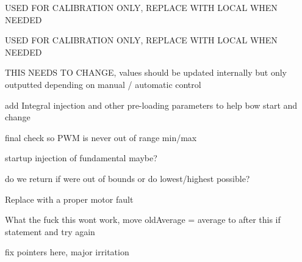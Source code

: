 
\begin{DoxyRefList}
\item[Member \mbox{\hyperlink{struct__calibrationData_a7359cc201af09ef84f616f19bf21a82b}{\+\_\+calibration\+Data\+::max\+Speed\+PWM}} ]\label{todo__todo000007}%
%
USED FOR CALIBRATION ONLY, REPLACE WITH LOCAL WHEN NEEDED  
\item[Member \mbox{\hyperlink{struct__calibrationData_a703fec13dcf0d8cf024236c6c97ca84f}{\+\_\+calibration\+Data\+::min\+Speed\+PWM}} ]\label{todo__todo000006}%
%
USED FOR CALIBRATION ONLY, REPLACE WITH LOCAL WHEN NEEDED  
\item[File \mbox{\hyperlink{bowcontrol_8cpp}{bowcontrol.cpp}} ]\label{todo__todo000001}%
%
THIS NEEDS TO CHANGE, values should be updated internally but only outputted depending on manual / automatic control  
\item[Member \mbox{\hyperlink{classbowControl_a51d03db7ff6ba45e3643b3cfb047c081}{bow\+Control\+::pid\+Control}} ()]\label{todo__todo000002}%
%
add Integral injection and other pre-\/loading parameters to help bow start and change 

final check so PWM is never out of range min/max 

startup injection of fundamental maybe?  
\item[Member \mbox{\hyperlink{classbowControl_af3c67773447df63befb6af1bfc978e03}{bow\+Control\+::set\+Harmonic}} (int \+\_\+harmonic)]\label{todo__todo000003}%
%
do we return if we\textquotesingle{}re out of bounds or do lowest/highest possible?  
\item[Member \mbox{\hyperlink{classbowControl_ac763e2c7400be2248ffad2e13462d60a}{bow\+Control\+::update\+String}} ()]\label{todo__todo000004}%
%
Replace with a proper motor fault  
\item[Member \mbox{\hyperlink{classbowIO_a4f7ef490b19cc4d9d6e3bd2e65d77061}{bow\+IO\+::average\+Freq}} ()]\label{todo__todo000005}%
%
What the fuck this wont work, move old\+Average = average to after this if statement and try again  
\item[Member \mbox{\hyperlink{classstringModule_a52a5b213e054d030023de05b46769555}{string\+Module\+::add\+Bow}} (char motor\+Rev\+Pin, char motor\+Voltage\+Pin, char motor\+DCDCEn, char tacho\+Pin, char current\+Sense\+Pin, char motor\+Fault\+Pin, char step\+En\+Pin, char step\+Dir\+Pin, char step\+Step\+Pin, Hardware\+Serial $\ast$step\+Serial\+Port, char step\+Home\+Sensor\+Pin, char step\+Correction\+Sensor\+Pin)]\label{todo__todo000009}%
%
fix pointers here, major irritation 
\end{DoxyRefList}